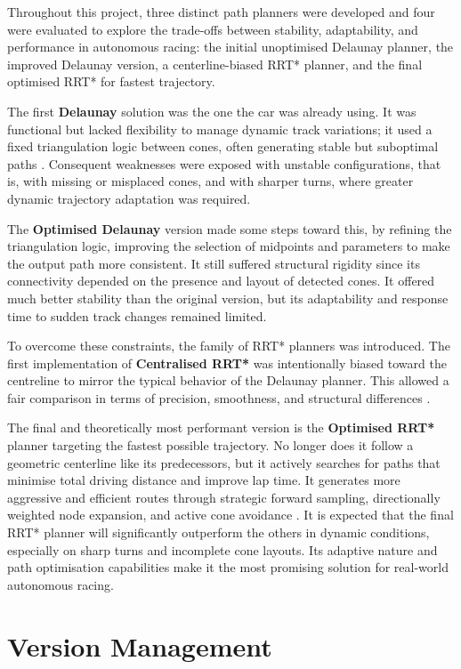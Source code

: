\documentclass[a4paper,11pt]{report}
\begin{document}
Throughout this project, three distinct path planners were developed and four were evaluated to explore the trade-offs between 
stability, adaptability, and performance in autonomous racing: the initial unoptimised Delaunay planner, 
the improved Delaunay version, a centerline-biased RRT* planner, and the final optimised RRT* for fastest trajectory.

The first \textbf{Delaunay} solution was the one the car was already using. It was functional but lacked flexibility
to manage dynamic track variations; it used a fixed triangulation logic between cones, often
generating stable but suboptimal paths \cite{reference6}. Consequent weaknesses were exposed with unstable
configurations, that is, with missing or misplaced cones, and with sharper turns, where greater
dynamic trajectory adaptation was required.

The \textbf{Optimised Delaunay} version made some steps toward this, by refining the triangulation logic,
improving the selection of midpoints and parameters to make the output path more consistent.
It still suffered structural rigidity since its connectivity depended on the presence and layout of
detected cones. It offered much better stability than the original version, but its adaptability and
response time to sudden track changes remained limited.

To overcome these constraints, the family of RRT* planners was introduced. The first implementation of \textbf{Centralised RRT*} was 
intentionally biased toward the centreline to mirror the typical behavior of the Delaunay planner.
This allowed a fair comparison in terms of precision, smoothness, and structural differences \cite{reference3}.

The final and theoretically most performant version is the \textbf{Optimised RRT*} planner targeting the fastest possible trajectory.
No longer does it follow a geometric centerline like its predecessors, but it actively searches for paths that minimise 
total driving distance and improve lap time. It generates more aggressive and efficient routes through strategic forward sampling, 
directionally weighted node expansion, and active cone avoidance \cite{reference4}.
It is expected that the final RRT* planner will significantly outperform 
the others in dynamic conditions, especially on sharp turns and incomplete cone layouts. 
Its adaptive nature and path optimisation capabilities make it the most promising solution for real-world autonomous racing.

\section{Version Management}
\end{document}
